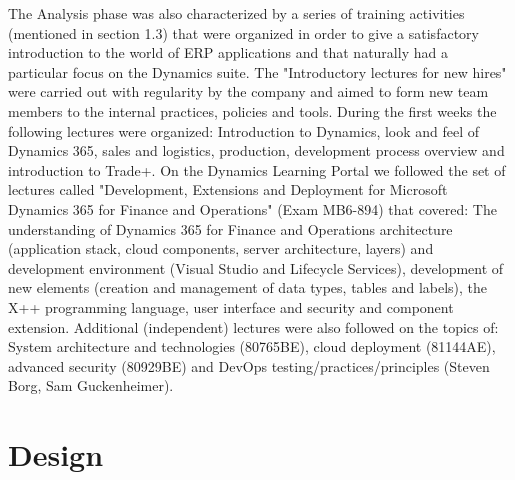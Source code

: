 The Analysis phase was also characterized by a series of training activities (mentioned in section 1.3) that were organized in order to give a satisfactory introduction to the world of ERP applications and that naturally had a particular focus on the Dynamics suite. The "Introductory lectures for new hires" were carried out with regularity by the company and aimed to form new team members to the internal practices, policies and tools. During the first weeks the following lectures were organized: Introduction to Dynamics, look and feel of Dynamics 365, sales and logistics, production, development process overview and introduction to Trade+. On the Dynamics Learning Portal we followed the set of lectures called "Development, Extensions and Deployment for Microsoft Dynamics 365 for Finance and Operations" (Exam MB6-894) that covered: The understanding of Dynamics 365 for Finance and Operations architecture (application stack, cloud components, server architecture, layers) and development environment (Visual Studio and Lifecycle Services), development of new elements (creation and management of data types, tables and labels), the X++ programming language, user interface and security and component extension. Additional (independent) lectures were also followed on the topics of: System architecture and technologies (80765BE), cloud deployment (81144AE), advanced security (80929BE) and DevOps testing/practices/principles (Steven Borg, Sam Guckenheimer).

\section{Design} 

